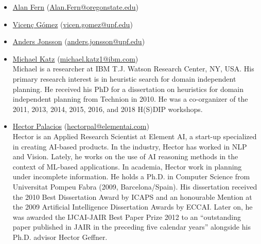 \documentclass[10pt]{article}
\begin{document}
\begin{itemize}

\item \href{http://web.engr.oregonstate.edu/~afern/}{Alan Fern}
  (\href{mailto:Alan.Fern@oregonstate.edu}{Alan.Fern@oregonstate.edu})\\
  
\item \href{https://www.upf.edu/web/vgomez}{Vicen\c{c} G\'{o}mez}
  (\href{mailto:vicen.gomez@upf.edu}{vicen.gomez@upf.edu})\\

\item \href{https://www.upf.edu/web/anders-jonsson}{Anders Jonsson}
  (\href{mailto:anders.jonsson@upf.edu}{anders.jonsson@upf.edu})\\
    
\item \href{https://resedit.watson.ibm.com/researcher/view.php?person=ibm-Michael.Katz1}{Michael Katz}
 (\href{mailto:michael.katz1@ibm.com}{michael.katz1@ibm.com})\\
 Michael is a researcher at IBM T.J. Watson Research Center, NY, USA. His
 primary research interest is in heuristic search for domain independent planning.
 He received his PhD for a dissertation on heuristics for domain independent
 planning from Technion in 2010.
 He was a co-organizer of the 2011, 2013, 2014, 2015, 2016, and 2018 H(S)DIP
 workshops.

\item \href{http://hectorpalacios.net/}{Hector Palacios}
  (\href{mailto:hectorpal@elementai.com}{hectorpal@elementai.com})\\
Hector is an Applied Research Scientist at Element AI, a start-up specialized in creating AI-based products. In the industry, Hector has worked in NLP and Vision. Lately,  he works on the use of AI reasoning methods in the context of ML-based applications. In academia, Hector work in planning under incomplete information. He holds a Ph.D. in Computer Science from Universitat Pompeu Fabra (2009, Barcelona/Spain). His dissertation received the 2010 Best Dissertation Award by ICAPS and an honourable Mention at the 2009 Artificial Intelligence Dissertation Awards by ECCAI. Later on, he was awarded the IJCAI-JAIR Best Paper Prize 2012 to an “outstanding paper published in JAIR in the preceding five calendar years” alongside his Ph.D. advisor Hector Geffner.   


\end{itemize}
\end{document}
